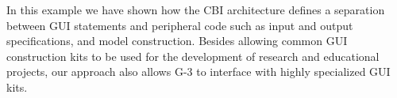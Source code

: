 \documentclass[10pt]{article}
\begin{document}









In this example we have shown how the CBI architecture defines a
separation between GUI statements and peripheral code such as input
and output specifications, and model construction.  Besides allowing
common GUI construction kits to be used for the development of
research and educational projects, our approach also allows G-3 to
interface with highly specialized GUI kits.
\end{document}
